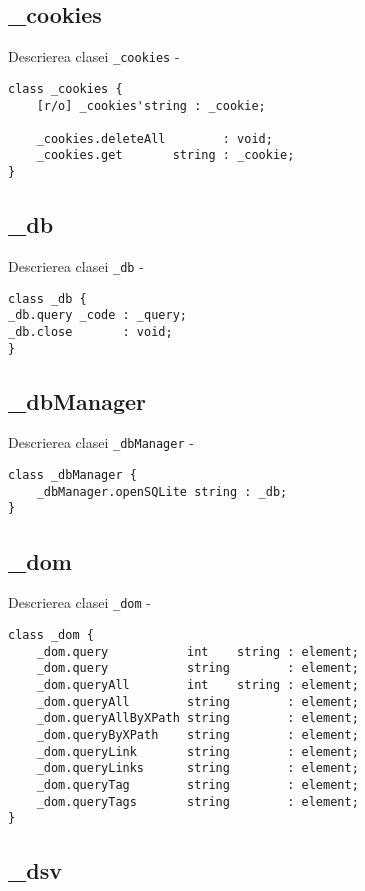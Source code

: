 \subsection{{\color{orange} \_cookies}}

\noindent Descrierea clasei \texttt{\_cookies} -
\begin{verbatim}
class _cookies {
	[r/o] _cookies'string : _cookie;

	_cookies.deleteAll        : void;
	_cookies.get       string : _cookie;
}
\end{verbatim}

\subsection{{\color{orange} \_db}}

\noindent Descrierea clasei \texttt{\_db} -
\begin{verbatim}
class _db {
_db.query _code : _query;
_db.close       : void;
}
\end{verbatim}

\subsection{{\color{orange} \_dbManager}}

\noindent Descrierea clasei \texttt{\_dbManager} -
\begin{verbatim}
class _dbManager {
	_dbManager.openSQLite string : _db;
}
\end{verbatim}

\subsection{{\color{orange} \_dom}}

\noindent Descrierea clasei \texttt{\_dom} -
\begin{verbatim}
class _dom {
	_dom.query           int    string : element;
	_dom.query           string        : element;
	_dom.queryAll        int    string : element;
	_dom.queryAll        string        : element;
	_dom.queryAllByXPath string        : element;
	_dom.queryByXPath    string        : element;
	_dom.queryLink       string        : element;
	_dom.queryLinks      string        : element;
	_dom.queryTag        string        : element;
	_dom.queryTags       string        : element;
}
\end{verbatim}

\subsection{{\color{orange} \_dsv}}

